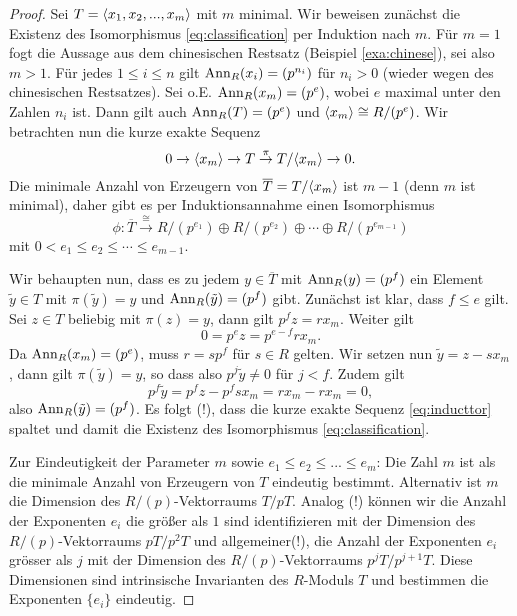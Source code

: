 \documentclass{book}
\begin{document}
\begin{proof}
    Sei $T = \langle  x_1, x_2, ..., x_m  \rangle$ mit $m$ minimal. Wir beweisen zunächst die
    Existenz des Isomorphismus \eqref{eq:classification} per Induktion nach
    $m$. Für $m=1$ fogt die Aussage aus dem chinesischen Restsatz (Beispiel
    \ref{exa:chinese}), sei also $m>1$. Für jedes $1 \le i \le n$ gilt
    $\operatorname{Ann}_R(x_i) = (p^{n_i})$ für $n_i >0$ (wieder wegen des chinesischen
    Restsatzes). Sei o.E. $\operatorname{Ann}_R(x_m) = (p^{e})$, wobei $e$ maximal unter den
    Zahlen $n_i$ ist. Dann gilt auch $\operatorname{Ann}_R(T) = (p^e)$ und $\langle  x_m  \rangle \cong
    R/(p^e)$. Wir betrachten nun die kurze exakte Sequenz
    \begin{equation}\label{eq:inducttor}
        0 \to \langle  x_m  \rangle \to T \overset{\pi}{\to} T/\langle  x_m  \rangle \to 0.
    \end{equation}
    Die minimale Anzahl von Erzeugern von $\overline{T} = T/\langle  x_m  \rangle$ ist
    $m-1$ (denn $m$ ist minimal), daher gibt es per Induktionsannahme einen Isomorphismus
    \[
        \phi: \overline{T} \overset{\cong}{\to} R/(p^{e_1}) \oplus R/(p^{e_2}) \oplus \cdots \oplus R/(p^{e_{m-1}})
    \]
    mit $0 < e_1 \le e_2 \le \cdots \le e_{m-1}$.

    Wir behaupten nun, dass es zu jedem $y \in \overline{T}$ mit
    $\operatorname{Ann}_R(y) = (p^f)$ ein Element $\tilde{y} \in T$ mit $\pi(\tilde{y}) =
    y$ und $\operatorname{Ann}_R(\tilde{y}) = (p^f)$ gibt. Zunächst ist klar, dass $f \le e$ gilt. Sei $z
    \in T$ beliebig mit $\pi(z) = y$, dann gilt $p^fz = r x_m$. Weiter gilt
    \[
        0 = p^e z = p^{e-f} r x_m.
    \]
    Da $\operatorname{Ann}_R(x_m) = (p^e)$, muss $r = s p^f$ für $s \in R$ gelten. Wir setzen
    nun $\tilde{y} = z - s x_m$, dann gilt $\pi(\tilde{y}) = y$, so dass also $p^j \tilde{y} \ne 0$ für
    $j < f$. Zudem gilt
    \[
        p^f \tilde{y} = p^f z - p^f s x_m = r x_m - r x_m = 0,
    \]
    also $\operatorname{Ann}_R(\tilde{y}) = (p^f)$. Es folgt (!), dass die kurze exakte Sequenz
    \eqref{eq:inducttor} spaltet und damit die Existenz des Isomorphismus
    \eqref{eq:classification}.

    Zur Eindeutigkeit der Parameter $m$ sowie $e_1 \le e_2 \le ... \le e_m$:
    Die Zahl $m$ ist als die minimale Anzahl von Erzeugern von $T$ eindeutig
    bestimmt. Alternativ ist $m$ die Dimension des $R/(p)$-Vektorraums $T/pT$.
    Analog (!) können wir die Anzahl der Exponenten $e_i$ die größer als $1$ sind
    identifizieren mit der Dimension des $R/(p)$-Vektorraums $pT/p^2T$ und
    allgemeiner(!), die Anzahl der Exponenten $e_i$ grösser als $j$ mit der
    Dimension des $R/(p)$-Vektorraums $p^jT/p^{j+1}T$. Diese Dimensionen sind
    intrinsische Invarianten des $R$-Moduls $T$ und bestimmen die Exponenten
    $\{e_i\}$ eindeutig. 
\end{proof}
\end{document}
